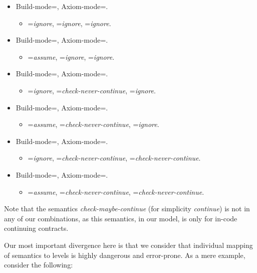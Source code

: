 \begin{itemize}
\item Build-mode=, Axiom-mode=.
\begin{itemize}
  \item {}=\emph{ignore}, =\emph{ignore}, =\emph{ignore}.
\end{itemize}
\item Build-mode=, Axiom-mode=.
\begin{itemize}
  \item {}=\emph{assume}, =\emph{ignore}, =\emph{ignore}.
\end{itemize}
\item Build-mode=, Axiom-mode=.
\begin{itemize}
  \item {}=\emph{ignore}, =\emph{check-never-continue}, =\emph{ignore}.
\end{itemize}
\item Build-mode=, Axiom-mode=.
\begin{itemize}
  \item {}=\emph{assume}, =\emph{check-never-continue}, =\emph{ignore}.
\end{itemize}
\item Build-mode=, Axiom-mode=.
\begin{itemize}
  \item {}=\emph{ignore}, =\emph{check-never-continue}, =\emph{check-never-continue}.
\end{itemize}
\item Build-mode=, Axiom-mode=.
\begin{itemize}
  \item {}=\emph{assume}, =\emph{check-never-continue}, =\emph{check-never-continue}.
\end{itemize}
\end{itemize}

Note that the semantics \emph{check-maybe-continue} 
(for simplicity \emph{continue}) is not in any of our combinations, 
as this semantics, in our model, is only for in-code continuing contracts.

Our most important divergence here is that we consider that individual mapping of
semantics to levels is highly dangerous and error-prone. As a mere example,
consider the following:

